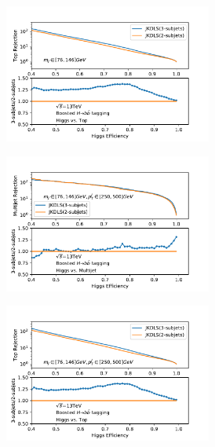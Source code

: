 \begin{figure}[htbp]
\begin{subfigure}{.5\textwidth}
     \caption{}
   \label{fig:}
  \end{subfigure}
  \begin{subfigure}{.5\textwidth}
  \centering
   \includegraphics[width=0.75\textwidth]{figuresXbb/Subjet/SUBTopMASS.pdf}
     \caption{}
   \label{fig:}
  \end{subfigure}
 \newline 
   \begin{subfigure}{.5\textwidth}
  \centering
   \includegraphics[width=0.75\textwidth]{figuresXbb/Subjet/SUBQCDMASSPT1.pdf}
     \caption{}
   \label{fig:}
  \end{subfigure}
  \begin{subfigure}{.5\textwidth}
  \centering
   \includegraphics[width=0.75\textwidth]{figuresXbb/Subjet/SUBTopMASSPT1.pdf}

\end{subfigure}
\end{figure}
